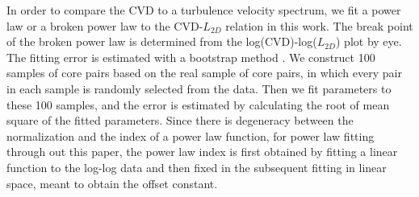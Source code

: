 \documentclass[iop,revtex4]{emulateapj}
\begin{document}
In order to compare the CVD to a turbulence velocity spectrum, we fit a power law or a broken power law to the CVD-$L_{2D}$ relation in this work. The break point of the broken power law is determined from the log(CVD)-log($L_{2D}$) plot by eye. The fitting error is estimated with a bootstrap method \citep{nr}. We construct 100 samples of core pairs based on the real sample of core pairs, in which every pair in each sample is randomly selected from the data. Then we fit parameters to these 100 samples, and the error is estimated by calculating the root of mean square of the fitted parameters. Since there is degeneracy between the normalization and the index of a power law function, for power law fitting through out this paper, the power law index is first obtained by fitting a linear function to the log-log data and then fixed in the subsequent fitting in linear space, meant to obtain the offset constant.
\end{document}
